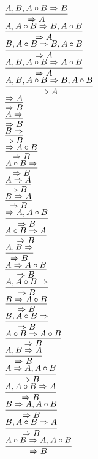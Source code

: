 \documentclass[11pt]{article}
\begin{document}
\begin{center}
\bigskip
\\$\infer{\Rightarrow A}{A, B, A\circ B\Rightarrow B}$
\bigskip
\\$\infer{\Rightarrow A}{A, A\circ B\Rightarrow B, A\circ B}$
\bigskip
\\$\infer{\Rightarrow A}{B, A\circ B\Rightarrow B, A\circ B}$
\bigskip
\\$\infer{\Rightarrow A}{A, B, A\circ B\Rightarrow A\circ B}$
\bigskip
\\$\infer{\Rightarrow A}{A, B, A\circ B\Rightarrow B, A\circ B}$
\bigskip
\\$\infer{\Rightarrow B}{\Rightarrow A}$
\bigskip
\\$\infer{\Rightarrow B}{A\Rightarrow }$
\bigskip
\\$\infer{\Rightarrow B}{B\Rightarrow }$
\bigskip
\\$\infer{\Rightarrow B}{\Rightarrow A\circ B}$
\bigskip
\\$\infer{\Rightarrow B}{A\circ B\Rightarrow }$
\bigskip
\\$\infer{\Rightarrow B}{A\Rightarrow A}$
\bigskip
\\$\infer{\Rightarrow B}{B\Rightarrow A}$
\bigskip
\\$\infer{\Rightarrow B}{\Rightarrow A, A\circ B}$
\bigskip
\\$\infer{\Rightarrow B}{A\circ B\Rightarrow A}$
\bigskip
\\$\infer{\Rightarrow B}{A, B\Rightarrow }$
\bigskip
\\$\infer{\Rightarrow B}{A\Rightarrow A\circ B}$
\bigskip
\\$\infer{\Rightarrow B}{A, A\circ B\Rightarrow }$
\bigskip
\\$\infer{\Rightarrow B}{B\Rightarrow A\circ B}$
\bigskip
\\$\infer{\Rightarrow B}{B, A\circ B\Rightarrow }$
\bigskip
\\$\infer{\Rightarrow B}{A\circ B\Rightarrow A\circ B}$
\bigskip
\\$\infer{\Rightarrow B}{A, B\Rightarrow A}$
\bigskip
\\$\infer{\Rightarrow B}{A\Rightarrow A, A\circ B}$
\bigskip
\\$\infer{\Rightarrow B}{A, A\circ B\Rightarrow A}$
\bigskip
\\$\infer{\Rightarrow B}{B\Rightarrow A, A\circ B}$
\bigskip
\\$\infer{\Rightarrow B}{B, A\circ B\Rightarrow A}$
\bigskip
\\$\infer{\Rightarrow B}{A\circ B\Rightarrow A, A\circ B}$
\bigskip

\end{center}
\end{document}
